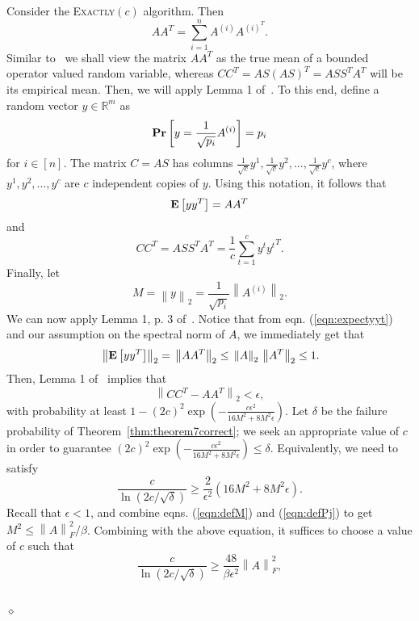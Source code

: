 \documentclass[11pt]{article}
\newcommand{\Probab}[1]{\mbox{}{\bf{Pr}}\left[#1\right]}
\newcommand{\Expect}[1]{\mbox{}{\bf{E}}\left[#1\right]}
\newcommand{\FNormS}[1]{\mbox{}\left\|#1\right\|_F^2}
\newcommand{\TNorm }[1]{\mbox{}\left\|#1\right\|_2  }
\newenvironment{Proof}{\noindent {\em Proof:}}{\\\hspace*{\fill}\mbox{$\diamond$}}
\begin{document}
\begin{Proof}
Consider the \textsc{Exactly}$(c)$ algorithm. Then
\begin{equation*}
AA^T = \sum_{i=1}^n A^{(i)} A^{{(i)}^T}.
\end{equation*}
Similar to~\cite{RV07} we shall view the matrix $AA^T$ as the true mean of a bounded operator valued random variable, whereas $CC^T = AS (AS)^T = ASS^TA^T$ will be its empirical mean. Then, we will apply Lemma 1 of~\cite{Oli10}. To this end, define a random vector $y \in \mathbb{R}^m$ as
\begin{equation*}
\Probab{y = \frac{1}{\sqrt{p_i}}A^{(i)}} = p_i
\end{equation*}
for $i \in [n]$. The matrix $C = AS$ has columns $\frac{1}{\sqrt{c}}y^1,\frac{1}{\sqrt{c}}y^2,\ldots,\frac{1}{\sqrt{c}}y^c$, where $y^1,y^2,\ldots,y^c$ are $c$ independent copies of $y$. Using this notation, it follows that
\begin{equation}\label{eqn:expectyyt}
\Expect{yy^T} = AA^T
\end{equation}
and
\begin{equation*}
CC^T = ASS^TA^T = \frac{1}{c}\sum_{t=1}^c y^t{y^t}^T.
\end{equation*}
Finally, let
\begin{equation}\label{eqn:defM}
M = \TNorm{y} = \frac{1}{\sqrt{p_i}}\TNorm{A^{(i)}}.
\end{equation}
We can now apply Lemma 1, p. 3 of~\cite{Oli10}. Notice that from eqn. (\ref{eqn:expectyyt}) and our assumption on the spectral norm of $A$, we immediately get that $$\TNorm{\Expect{yy^T}} = \TNorm{AA^T} \leq \TNorm{A}\TNorm{A^T} \leq 1.$$ Then, Lemma 1 of~\cite{Oli10} implies that
\begin{equation}\label{eqn:ExpectBound}
\TNorm{CC^T-AA^T} < \epsilon,
\end{equation}
with probability at least $1-\left(2c\right)^2 \exp\left(-\frac{c\epsilon^2}{16M^2 + 8M^2 \epsilon}\right)$. Let $\delta$ be the failure probability of Theorem~\ref{thm:theorem7correct}; we seek an appropriate value of $c$ in order to guarantee $\left(2c\right)^2 \exp\left(-\frac{c\epsilon^2}{16M^2 + 8M^2 \epsilon}\right) \leq \delta$. Equivalently, we need to satisfy
$$\frac{c}{\ln \left(2c/\sqrt{\delta}\right)} \geq \frac{2}{\epsilon^2}\left(16M^2 + 8M^2\epsilon\right).$$
Recall that $\epsilon < 1$, and combine eqns. (\ref{eqn:defM}) and (\ref{eqn:defPj}) to get $M^2 \leq \FNormS{A}/\beta$. Combining with the above equation, it suffices to choose a value of $c$ such that
$$\frac{c}{\ln \left(2c/\sqrt{\delta}\right)} \geq \frac{48}{\beta\epsilon^2}\FNormS{A},$$

\end{Proof}
\end{document}
